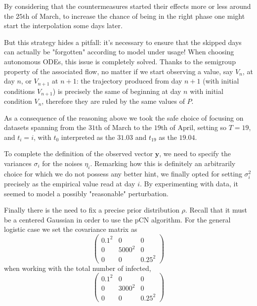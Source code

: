 \documentclass[8pt]{article}
\begin{document}
By considering that the countermeasures started their effects more or less 
around the $25$th of March, to increase
the chance of being in the right phase one might 
start the interpolation some days later.


But this strategy hides a pitfall: 
it's necessary to ensure that the skipped days
can actually be "forgotten" according to model under usage!
When choosing autonomous ODEs, this issue is completely solved.
Thanks to the semigroup property of the associated flow,
no matter if we start observing a value, say $V_n$, at 
day $n$, or $V_{n+1}$ at $n+1$: 
the trajectory produced from day $n+1$ (with initial
conditions $V_{n+1}$) is precisely the same of
beginning at day $n$ with initial condition $V_n$, therefore
they are ruled by the same values of $P$.


As a consequence of the reasoning above we took the safe choice
of focusing on datasets spanning from the $31$th of March to the
$19$th of April, setting so $T = 19$, and $t_i = i$, with $t_0$ 
interpreted as the $31.03$ and $t_{19}$ as the $19.04$. 


To complete the definition of the observed vector $\textbf{y}$,
we need to specify the variances $\sigma_i$ for the noises $\eta_i$.
Remarking how this is definitely an arbitrarily choice for which we do not
possess any better hint, we finally opted for setting $\sigma_i^2$
precisely as the empirical value read at day $i$. By experimenting
with data, it seemed to model a possibly "reasonable" perturbation.


Finally there is the need to fix a precise prior distribution $\rho$.
Recall that it must be
a centered Gaussian in order to use the pCN algorithm. For the general
logistic case we set the covariance matrix as
\begin{equation}
\begin{pmatrix}
	0.1^2 & 0 & 0 \\
	0 & 5000^2 & 0 \\
	0 & 0 & 0.25^2
\end{pmatrix}
\end{equation}
when working with the total number of infected,
\begin{equation}
\begin{pmatrix}
	0.1^2 & 0 & 0 \\
	0 & 3000^2 & 0 \\
	0 & 0 & 0.25^2
\end{pmatrix}
\end{equation}
\end{document}
